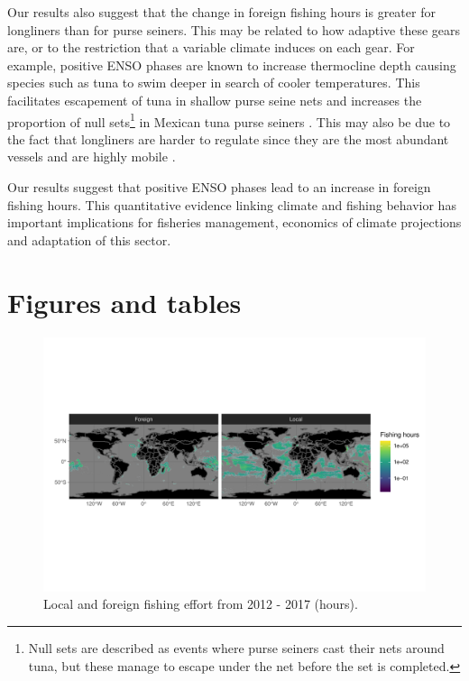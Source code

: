 \documentclass[]{article}
\let\rmarkdownfootnote\footnote%
\def\footnote{\protect\rmarkdownfootnote}
\begin{document}
Our results also suggest that the change in foreign fishing hours is greater for longliners than for purse seiners. This may be related to how adaptive these gears are, or to the restriction that a variable climate induces on each gear. For example, positive ENSO phases are known to increase thermocline depth causing species such as tuna to swim deeper in search of cooler temperatures. This facilitates escapement of tuna in shallow purse seine nets and increases the proportion of null sets\footnote{Null sets are described as events where purse seiners cast their nets around tuna, but these manage to escape under the net before the set is completed.} in Mexican tuna purse seiners \citep{dreyfusleon_2015}. This may also be due to the fact that longliners are harder to regulate since they are the most abundant vessels and are highly mobile \citep{sala_2018,ortuocrespo_2018}.

Our results suggest that positive ENSO phases lead to an increase in foreign fishing hours. This quantitative evidence linking climate and fishing behavior has important implications for fisheries management, economics of climate projections and adaptation of this sector.

\clearpage

\hypertarget{figures-and-tables}{%
\section{Figures and tables}\label{figures-and-tables}}

\begin{figure}
\centering
\includegraphics{img/GFW_raster.pdf}
\caption{\label{fig:gfw} Local and foreign fishing effort from 2012 - 2017 (hours).}
\end{figure}
\end{document}
